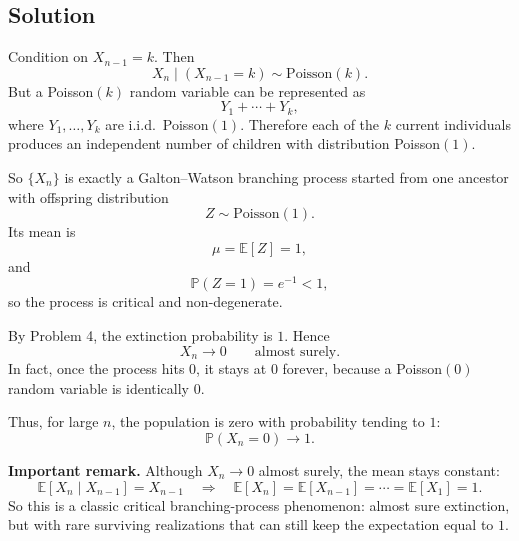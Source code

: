 \documentclass[11pt]{article}
\newcommand{\EE}{\mathbb{E}}
\newcommand{\PP}{\mathbb{P}}
\begin{document}
\subsection*{Solution}

Condition on $X_{n-1}=k$. Then
\[
X_n \mid (X_{n-1}=k) \sim \mathrm{Poisson}(k).
\]
But a Poisson$(k)$ random variable can be represented as
\[
Y_1+\cdots+Y_k,
\]
where $Y_1,\dots,Y_k$ are i.i.d.\ Poisson$(1)$. Therefore each of the $k$ current individuals
produces an independent number of children with distribution Poisson$(1)$.

So $\{X_n\}$ is exactly a Galton--Watson branching process started from one ancestor with
offspring distribution
\[
Z \sim \mathrm{Poisson}(1).
\]
Its mean is
\[
\mu=\EE[Z]=1,
\]
and
\[
\PP(Z=1)=e^{-1}<1,
\]
so the process is critical and non-degenerate.

By Problem 4, the extinction probability is $1$. Hence
\[
X_n \to 0 \qquad \text{almost surely}.
\]
In fact, once the process hits $0$, it stays at $0$ forever, because a Poisson$(0)$ random
variable is identically $0$.

Thus, for large $n$, the population is zero with probability tending to $1$:
\[
\PP(X_n=0)\to 1.
\]

\medskip
\noindent
\textbf{Important remark.} Although $X_n\to 0$ almost surely, the mean stays constant:
\[
\EE[X_n \mid X_{n-1}] = X_{n-1}
\quad \Longrightarrow \quad
\EE[X_n]=\EE[X_{n-1}]=\cdots=\EE[X_1]=1.
\]
So this is a classic critical branching-process phenomenon: almost sure extinction, but with
rare surviving realizations that can still keep the expectation equal to $1$.
\end{document}
